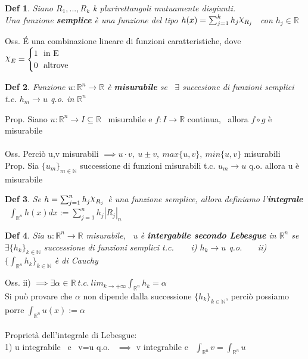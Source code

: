 \documentclass{article}
\theoremstyle{unnumbered}
\newtheorem* {theoremT}{Def}
\theoremstyle{unnumbered1}
\newenvironment{defi}{\begin{gBox}\begin{theoremT}}{\end{theoremT}\end{gBox}}
\DeclareRobustCommand{\Chi}{{\mathpalette\irchi\relax}}
\newcommand{\irchi}[2]{\raisebox{\depth}{$#1\chi$}} %
\begin{document}
\begin{defi}
Siano $R_1,...,R_k$ k plurirettangoli mutuamente disgiunti.\\
Una funzione \textbf{semplice} è una funzione del tipo $h(x)=\sum_{j=1}^k h_j\Chi_{R_j}$ \ con $h_j\in\mathbb{R}$
\end{defi}
Oss. É una combinazione lineare di funzioni caratteristiche, dove \ $\Chi_E=\begin{cases} 1 \ \text{ in E} \\ 0 \ \text{ altrove}\end{cases}$
\begin{defi}
Funzione $u:\mathbb{R}^n\rightarrow\mathbb{R}$ è \textbf{misurabile} se \ $\exists$ succesione di funzioni semplici t.c. $h_m\rightarrow u$ q.o. in $\mathbb{R}^n$
\end{defi}
%
Prop. Siano $u:\mathbb{R}^n\rightarrow I\subseteq\mathbb{R}$ \ misurabile e $f:I\rightarrow\mathbb{R}$ continua, \ allora $f\circ g$ è misurabile\\ \\
%
Oss. Perciò u,v misurabili $\implies u\cdot v, \ u\pm v, \ max\{u,v\}, \ min\{u,v\}$ misurabili\\
%
Prop. Sia $\{u_m\}_{m\in\mathbb{N}}$ successione di funzioni misurabili t.c. $u_m\rightarrow u$ q.o. allora u è misurabile
\begin{defi}
Se $h=\sum_{j=1}^n h_j\Chi_{R_j}$ è una funzione semplice, allora definiamo l'\textbf{integrale} \ $\int_{\mathbb{R}^n}h(x)dx:=\sum_{j=1}^nh_j|R_j|_n$
\end{defi}
\begin{defi}
Sia $u:\mathbb{R}^n\rightarrow\mathbb{R}$ misurabile, \ u è \textbf{intergabile secondo Lebesgue} in  $\mathbb{R}^n$ se\\ $\exists\{h_k\}_{k\in\mathbb{N}}$ successione di funzioni semplici t.c.\ \ \ \
i) $h_k\rightarrow u$ q.o. \ \ \ ii) $\{\int_{\mathbb{R}^n}h_k\}_{k\in\mathbb{N}}$ è di Cauchy
\end{defi}
%
Oss. ii) $\implies \exists \alpha\in\mathbb{R} \ t.c. \ lim_{k\to +\infty}\int_{\mathbb{R}^n}h_k=\alpha$\\
Si può provare che $\alpha$ non dipende dalla successione $\{h_k\}_{k\in\mathbb{N}}$, perciò possiamo porre $\int_{\mathbb{R}^n}u(x):=\alpha$\\ \\
%
%
Proprietà dell'integrale di Lebesgue:\\
1) u integrabile \ e \ v=u q.o. \ $\implies$ v integrabile e \ $\int_{\mathbb{R}^n}v =\int_{\mathbb{R}^n}u $\\
\end{document}
